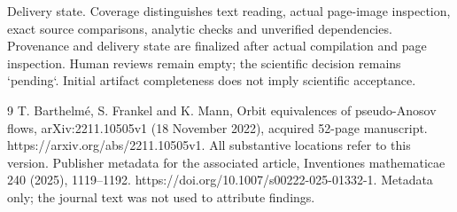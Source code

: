 \documentclass[10pt]{article}
\begin{document}
Delivery state. Coverage distinguishes text reading, actual page-image inspection, exact source comparisons, analytic checks and unverified dependencies. Provenance and delivery state are finalized after actual compilation and page inspection. Human reviews remain empty; the scientific decision remains `pending`. Initial artifact completeness does not imply scientific acceptance.\par
9 T. Barthelmé, S. Frankel and K. Mann, Orbit equivalences of pseudo-Anosov flows, arXiv:2211.10505v1 (18 November 2022), acquired 52-page manuscript. https://arxiv.org/abs/2211.10505v1. All substantive locations refer to this version. Publisher metadata for the associated article, Inventiones mathematicae 240 (2025), 1119–1192. https://doi.org/10.1007/s00222-025-01332-1. Metadata only; the journal text was not used to attribute findings.\par
\end{document}
